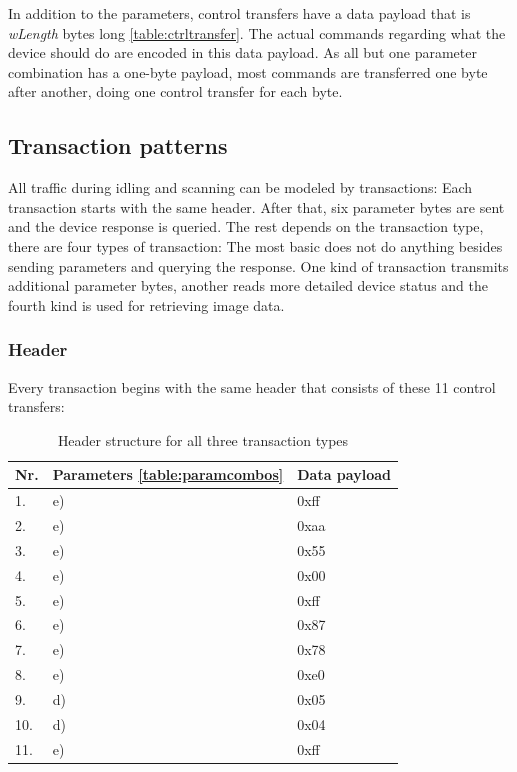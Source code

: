\documentclass{article}
\begin{document}
In addition to the parameters, control transfers have a data payload that is {\it wLength} bytes long \autoref{table:ctrltransfer}.
The actual commands regarding what the device should do are encoded in this data payload.
As all but one parameter combination has a one-byte payload, most commands are transferred
one byte after another, doing one control transfer for each byte.

\subsection{Transaction patterns}
\label{ssec:transactionpatterns}

All traffic during idling and scanning can be modeled by transactions: Each transaction
starts with the same header. After that, six parameter bytes are sent and the
device response is queried. The rest depends on the transaction type, there
are four types of transaction: The most basic does not do anything besides sending parameters and querying the response.
One kind of transaction transmits additional parameter bytes, another reads more detailed device status
and the fourth kind is used for retrieving image data.

\subsubsection{Header}

Every transaction begins with the same header that consists of these 11 control transfers:

\begin{table}[H]
  \caption{Header structure for all three transaction types}
  \centering
  \begin{tabular}{l|l|l}
    Nr. & Parameters \autoref{table:paramcombos} & Data payload \\ \hline
    1. & e) & 0xff \\
    2. & e) & 0xaa \\
    3. & e) & 0x55 \\
    4. & e) & 0x00 \\
    5. & e) & 0xff \\
    6. & e) & 0x87 \\
    7. & e) & 0x78 \\
    8. & e) & 0xe0 \\
    9. & d) & 0x05 \\
    10. & d) & 0x04 \\
    11. & e) & 0xff \\
  \end{tabular}
  \label{table:transheader}
\end{table}
\end{document}
